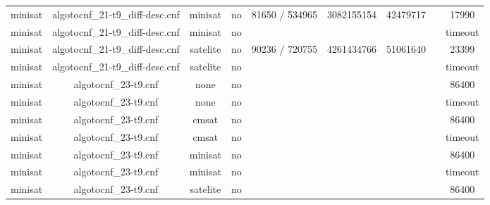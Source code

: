 \begin{appendices}
\begin{table}[p]
\begin{center}
\begin{tabular}{l|cccccccc}
  minisat                        & algotocnf\_21-t9\_diff-desc.cnf & minisat    & no    & 81650 / 534965 & 3082155154 & 42479717  &            & 17990 \\ %
  minisat                        & algotocnf\_21-t9\_diff-desc.cnf & minisat    & no    &            &           &           &            & timeout \\ %
  minisat                        & algotocnf\_21-t9\_diff-desc.cnf & satelite   & no    & 90236 / 720755 & 4261434766 & 51061640  &            & 23399 \\ %
  minisat                        & algotocnf\_21-t9\_diff-desc.cnf & satelite   & no    &            &           &           &            & timeout \\ %
  minisat                        & algotocnf\_23-t9.cnf           & none       & no    &            &           &           &            & 86400 \\ %
  minisat                        & algotocnf\_23-t9.cnf           & none       & no    &            &           &           &            & timeout \\ %
  minisat                        & algotocnf\_23-t9.cnf           & cmsat      & no    &            &           &           &            & 86400 \\ %
  minisat                        & algotocnf\_23-t9.cnf           & cmsat      & no    &            &           &           &            & timeout \\ %
  minisat                        & algotocnf\_23-t9.cnf           & minisat    & no    &            &           &           &            & 86400 \\ %
  minisat                        & algotocnf\_23-t9.cnf           & minisat    & no    &            &           &           &            & timeout \\ %
  minisat                        & algotocnf\_23-t9.cnf           & satelite   & no    &            &           &           &            & 86400 \\ %

\end{tabular}
\end{center}
\end{table}
\end{appendices}
